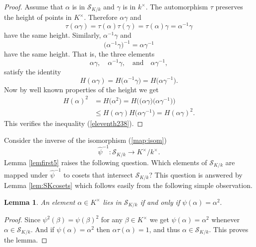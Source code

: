 \documentclass[11pt]{amsart}
\newtheorem{lemma}{Lemma}[section]
\numberwithin{equation}{eqncounter}
\def\NKk{\mathcal{S}_{K/k}}
\begin{document}
\begin{proof}  Assume that $\alpha$ is in $\NKk$ and $\gamma$ is in $k^{\times}$.  The automorphism $\tau$ preserves the height of points in 
$K^{\times}$.  Therefore $\alpha \gamma$ and
\begin{equation*}
\tau(\alpha \gamma) = \tau(\alpha) \tau(\gamma) = \tau(\alpha) \gamma = \alpha^{-1} \gamma
\end{equation*}
have the same height.  Similarly, $\alpha^{-1} \gamma$ and
\begin{equation*}\label{eleventh252}
\bigl(\alpha^{-1} \gamma\bigr)^{-1} = \alpha \gamma^{-1}
\end{equation*}
have the same height.  That is, the three elements
\begin{equation*}\label{eleventh259}
\alpha \gamma, \quad \alpha^{-1} \gamma,\quad\text{and}\quad \alpha \gamma^{-1},
\end{equation*}
satisfy the identity
\begin{equation*}
H(\alpha \gamma) = H\bigl(\alpha^{-1} \gamma\bigr) = H\bigl(\alpha \gamma^{-1}\bigr).
\end{equation*}
Now by well known properties of the height we get
\begin{equation*}
\begin{split}
H(\alpha)^2 &= H\bigl(\alpha^2\bigr) = H\bigl(\bigl(\alpha \gamma\bigr) \bigl(\alpha \gamma^{-1}\bigr)\bigr)\\
		&\le H(\alpha \gamma)H\bigl(\alpha \gamma^{-1}\bigr) = H(\alpha \gamma)^2.
\end{split}
\end{equation*}  
This verifies the inequality  (\ref{eleventh238}).
\end{proof}

Consider the inverse of the isomorphism (\ref{map:isom})
$${\hat{\psi}}^{-1}:\NKk \to K^\times/k^\times.$$
Lemma \ref{lemfirst5} raises the following question. Which elements of $\NKk$ 
are mapped under ${\hat{\psi}}^{-1}$ to cosets that intersect $\NKk$?
This question is answered by  Lemma \ref{lem:SKcosets} which follows easily from the 
following simple observation.

 
\begin{lemma}\label{lem:psionSK}
An element $\alpha \in K^\times$ lies in $\NKk$ if and only if 
$\psi(\alpha)=\alpha^2.$
\end{lemma}
\begin{proof}
Since $\psi^2(\beta)=\psi(\beta)^2$ for any $\beta\in K^\times$ we get $\psi(\alpha)=\alpha^2$ whenever $\alpha \in \NKk$.
And if $\psi(\alpha)=\alpha^2$ then $\alpha\tau(\alpha)=1$, and thus $\alpha \in \NKk$.
This proves the lemma.
\end{proof}
 
\end{document}
